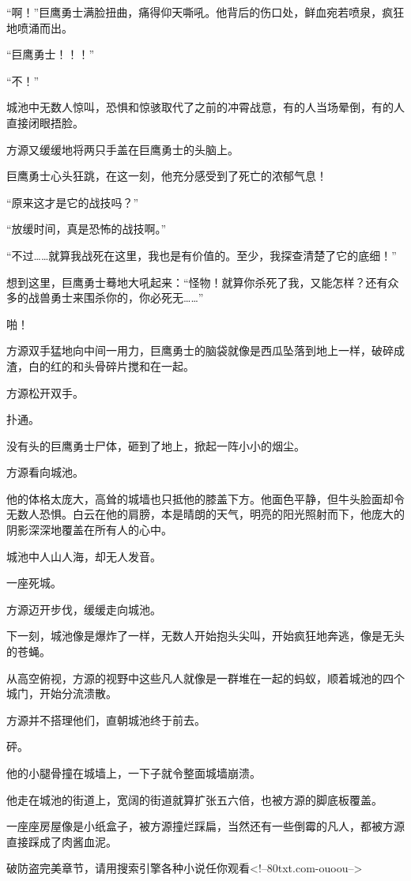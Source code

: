 \begin{this_body}
“啊！”巨鹰勇士满脸扭曲，痛得仰天嘶吼。他背后的伤口处，鲜血宛若喷泉，疯狂地喷涌而出。

“巨鹰勇士！！！”

“不！”

城池中无数人惊叫，恐惧和惊骇取代了之前的冲霄战意，有的人当场晕倒，有的人直接闭眼捂脸。

方源又缓缓地将两只手盖在巨鹰勇士的头脑上。

巨鹰勇士心头狂跳，在这一刻，他充分感受到了死亡的浓郁气息！

“原来这才是它的战技吗？”

“放缓时间，真是恐怖的战技啊。”

“不过……就算我战死在这里，我也是有价值的。至少，我探查清楚了它的底细！”

想到这里，巨鹰勇士蓦地大吼起来：“怪物！就算你杀死了我，又能怎样？还有众多的战兽勇士来围杀你的，你必死无……”

啪！

方源双手猛地向中间一用力，巨鹰勇士的脑袋就像是西瓜坠落到地上一样，破碎成渣，白的红的和头骨碎片搅和在一起。

方源松开双手。

扑通。

没有头的巨鹰勇士尸体，砸到了地上，掀起一阵小小的烟尘。

方源看向城池。

他的体格太庞大，高耸的城墙也只抵他的膝盖下方。他面色平静，但牛头脸面却令无数人恐惧。白云在他的肩膀，本是晴朗的天气，明亮的阳光照射而下，他庞大的阴影深深地覆盖在所有人的心中。

城池中人山人海，却无人发音。

一座死城。

方源迈开步伐，缓缓走向城池。

下一刻，城池像是爆炸了一样，无数人开始抱头尖叫，开始疯狂地奔逃，像是无头的苍蝇。

从高空俯视，方源的视野中这些凡人就像是一群堆在一起的蚂蚁，顺着城池的四个城门，开始分流溃散。

方源并不搭理他们，直朝城池终于前去。

砰。

他的小腿骨撞在城墙上，一下子就令整面城墙崩溃。

他走在城池的街道上，宽阔的街道就算扩张五六倍，也被方源的脚底板覆盖。

一座座房屋像是小纸盒子，被方源撞烂踩扁，当然还有一些倒霉的凡人，都被方源直接踩成了肉酱血泥。

破防盗完美章节，请用搜索引擎各种小说任你观看<!--80txt.com-ouoou-->

\end{this_body}

